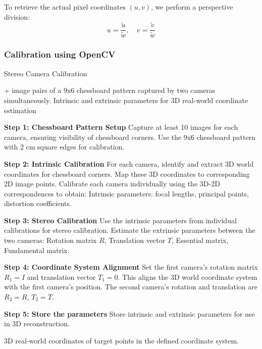 To retrieve the actual pixel coordinates \( (u, v) \), we perform a perspective division:
\[
	u = \frac{\tilde{u}}{\tilde{w}}, \quad v = \frac{\tilde{v}}{\tilde{w}}
\]


\subsubsection{Calibration using OpenCV}



\begin{algorithm}[H]
	\caption{Stereo Camera Calibration}
	\begin{algorithmic}[1]
		+ image pairs of a 9x6 chessboard pattern captured by two cameras simultaneously.
		\Ensure Intrinsic and extrinsic parameters for 3D real-world coordinate estimation

		\State \textbf{Step 1: Chessboard Pattern Setup}
		\State Capture at least 10 images for each camera, ensuring visibility of chessboard corners.
		\State Use the 9x6 chessboard pattern with 2 cm square edges for calibration.

		\State \textbf{Step 2: Intrinsic Calibration}
		\State For each camera, identify and extract 3D world coordinates for chessboard corners.
		\State Map these 3D coordinates to corresponding 2D image points.
		\State Calibrate each camera individually using the 3D-2D correspondences to obtain:
		\Statex \hspace{1em} Intrinsic parameters: focal lengths, principal points, distortion coefficients.

		\State \textbf{Step 3: Stereo Calibration}
		\State Use the intrinsic parameters from individual calibrations for stereo calibration.
		\State Estimate the extrinsic parameters between the two cameras:
		\Statex \hspace{1em} Rotation matrix \( R \), Translation vector \( T \), Essential matrix, Fundamental matrix.

		\State \textbf{Step 4: Coordinate System Alignment}
		\State Set the first camera’s rotation matrix \( R_1 = I \) and translation vector \( T_1 = 0 \).
		\State This aligns the 3D world coordinate system with the first camera’s position.
		\State The second camera’s rotation and translation are \( R_2 = R \), \( T_2 = T \).

		\State \textbf{Step 5: Store the parameters}
		\State Store intrinsic and extrinsic parameters for use in 3D reconstruction.


		\Ensure 3D real-world coordinates of target points in the defined coordinate system.
	\end{algorithmic}
\end{algorithm}





